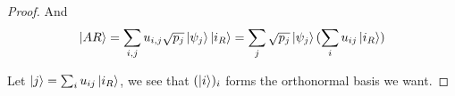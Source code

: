 \documentclass[../main.tex]{subfiles}
\begin{document}
\begin{enumerate}
\begin{proof}
        And
        \begin{equation*}
            \ket{AR} = \sum_{i,j}u_{i,j}\sqrt{p_j}\ket{\psi_j}\ket{i_R}
            = \sum_{j} \sqrt{p_j}\ket{\psi_j}(\sum_i u_{i j}\ket{i_R})
        \end{equation*}
        
        Let $\ket{j}=\sum_i u_{i j}\ket{i_R}$, we see that $(\ket{i})_i$ forms the orthonormal basis we want.
    \end{proof}
    
\end{enumerate}
\end{document}

